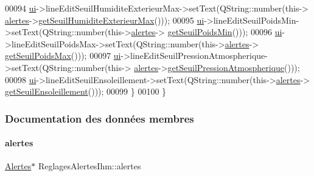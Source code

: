 \begin{DoxyCode}
00094         \hyperlink{class_reglages_alertes_ihm_af3a1fcc84fb1c76248b330372947b245}{ui}->lineEditSeuilHumiditeExterieurMax->setText(QString::number(this->
      \hyperlink{class_reglages_alertes_ihm_a9afa97e737d3c6a9a28a23fc4bc4beeb}{alertes}->\hyperlink{class_alertes_ad2c8daf5668f5d122efb9b84f7ea86de}{getSeuilHumiditeExterieurMax}()));
00095         \hyperlink{class_reglages_alertes_ihm_af3a1fcc84fb1c76248b330372947b245}{ui}->lineEditSeuilPoidsMin->setText(QString::number(this->\hyperlink{class_reglages_alertes_ihm_a9afa97e737d3c6a9a28a23fc4bc4beeb}{alertes}->
      \hyperlink{class_alertes_a228829e2826ee20cc014b2eb54addf14}{getSeuilPoidsMin}()));
00096         \hyperlink{class_reglages_alertes_ihm_af3a1fcc84fb1c76248b330372947b245}{ui}->lineEditSeuilPoidsMax->setText(QString::number(this->\hyperlink{class_reglages_alertes_ihm_a9afa97e737d3c6a9a28a23fc4bc4beeb}{alertes}->
      \hyperlink{class_alertes_a2c19b460f7f7cc7a867b5ed634371878}{getSeuilPoidsMax}()));
00097         \hyperlink{class_reglages_alertes_ihm_af3a1fcc84fb1c76248b330372947b245}{ui}->lineEditSeuilPressionAtmospherique->setText(QString::number(this->
      \hyperlink{class_reglages_alertes_ihm_a9afa97e737d3c6a9a28a23fc4bc4beeb}{alertes}->\hyperlink{class_alertes_a502fa36037246fb6eaad1db859bc1971}{getSeuilPressionAtmospherique}()));
00098         \hyperlink{class_reglages_alertes_ihm_af3a1fcc84fb1c76248b330372947b245}{ui}->lineEditSeuilEnsoleillement->setText(QString::number(this->\hyperlink{class_reglages_alertes_ihm_a9afa97e737d3c6a9a28a23fc4bc4beeb}{alertes}->
      \hyperlink{class_alertes_a54900058557979664d25137399ae2512}{getSeuilEnsoleillement}()));
00099     \}
00100 \}
\end{DoxyCode}


\subsubsection{Documentation des données membres}
\mbox{\label{class_reglages_alertes_ihm_a9afa97e737d3c6a9a28a23fc4bc4beeb}} 
\paragraph{\texorpdfstring{alertes}{alertes}}
{\footnotesize\ttfamily \hyperlink{class_alertes}{Alertes}$\ast$ Reglages\+Alertes\+Ihm\+::alertes\hspace{0.3cm}{\ttfamily [private]}}



